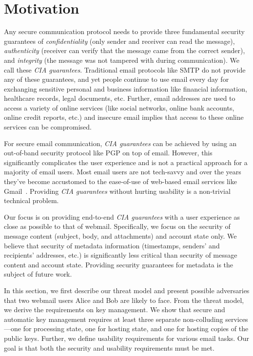 \section{Motivation}
\label{sec:motivation}

Any secure communication protocol needs to provide three 
fundamental security guarantees of \emph{confidentiality} 
(only sender and receiver can read the message), 
\emph{authenticity} (receiver can verify that the message came 
from the correct sender), and \emph{integrity} (the message 
was not tampered with during communication). We call these 
\emph{CIA guarantees}. Traditional email protocols like SMTP do not
provide any of these guarantees, and yet people continue to use email every day for exchanging sensitive personal and business information like financial information, healthcare records, legal documents, etc. Further, email addresses are used to access a variety of online services (like social networks, online bank accounts, online credit reports, etc.) and insecure email implies that access to these online services can be compromised.

For secure email communication, \emph{CIA guarantees} can be achieved by using an out-of-band security 
protocol like PGP on top of email. However, this significantly 
complicates the user experience and is not a practical approach 
for a majority of email users. Most email users are not tech-savvy 
and over the years they've become accustomed to the ease-of-use of 
web-based email services like Gmail~\cite{GMail}. Providing \emph{CIA 
guarantees} without hurting usability is a non-trivial technical problem.

Our focus is on providing end-to-end \emph{CIA guarantees} 
with a user experience as close as possible to that of webmail. 
Specifically, we focus on the security of message 
content (subject, body, and attachments) and account state only. We believe that security of metadata information (timestamps, senders' and recipients' addresses, etc.) is significantly less critical than security of message content and account state. 
Providing security guarantees for metadata is the subject of future work.  

In this section, we first describe our threat model and present possible adversaries 
that two webmail users Alice and Bob are likely to face. From the 
threat model, we derive the requirements on key management. We show that secure and automatic key management requires at least three separate non-colluding services---one for processing 
state, one for hosting state, and one for hosting copies of the public keys. Further, we define usability requirements for various email tasks. Our goal is that both the security and usability requirements must be met. 

